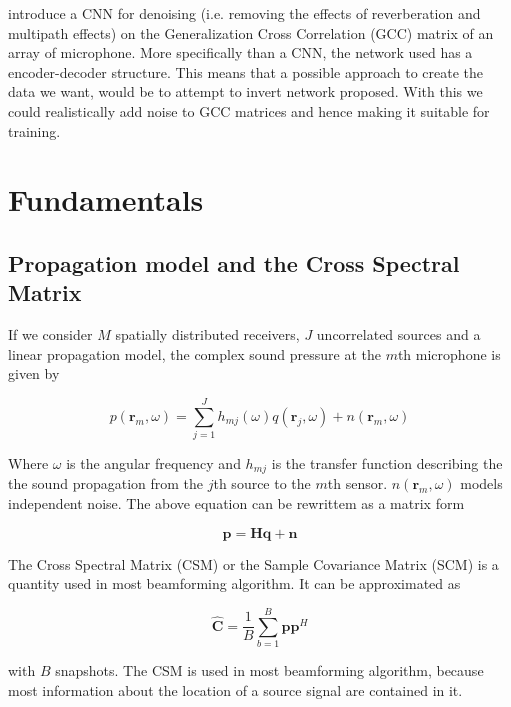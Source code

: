 \documentclass{article}
\begin{document}
\cite{vera2021acoustic} introduce a CNN for denoising (i.e. removing the effects of reverberation and multipath effects) on the Generalization Cross Correlation (GCC) matrix of an array of microphone. More specifically than a CNN, the network used has a encoder-decoder structure. This means that a possible approach to create the data we want, would be to attempt to invert network proposed. With this we could realistically add noise to GCC matrices and hence making it suitable for training.

\section{Fundamentals}

\subsection{Propagation model and the Cross Spectral Matrix}

If we consider $M$ spatially distributed receivers, $J$ uncorrelated sources and a linear propagation model, the complex sound pressure at the $m$th microphone is given by

\begin{equation}
    p(\mathbf{r}_m, \omega) = \sum_{j = 1}^{J} h_{mj}(\omega)q(\mathbf{r}_j, \omega) + n(\mathbf{r}_m, \omega)
\end{equation}

Where $\omega$ is the angular frequency and $h_{mj}$ is the transfer function  describing the  the sound propagation from the $j$th source to the $m$th sensor. $n(\mathbf{r}_m, \omega)$ models independent noise. The above equation can be rewrittem as a matrix form

\begin{equation}
    \mathbf{p} = \mathbf{H} \mathbf{q} + \mathbf{n}
\end{equation}

The Cross Spectral Matrix (CSM) or the Sample Covariance Matrix (SCM) is a quantity used in most beamforming algorithm. It can be approximated as

\begin{equation}
    \label{csm}
    \hat{\mathbf{C}} = \frac{1}{B} \sum_{b = 1}^{B} \mathbf{p}\mathbf{p}^H
\end{equation}

with $B$ snapshots. The CSM is used in most beamforming algorithm, because most information about the location of a source signal are contained in it.
\end{document}
